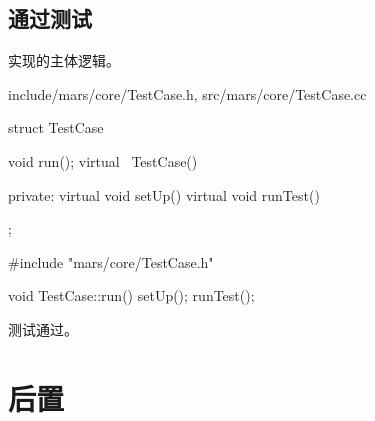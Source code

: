 \begin{content}
\subsection{通过测试}

实现的主体逻辑。

\begin{nodiff}{include/mars/core/TestCase.h, src/mars/core/TestCase.cc}
 \begin{c++}
struct TestCase {
  void run();
  virtual ~TestCase() {}

private:
  virtual void setUp() {}
  virtual void runTest() {}
};
 \end{c++}
\tcblower
 \begin{c++}
#include "mars/core/TestCase.h"

void TestCase::run() {
  setUp();
  runTest();
}
 \end{c++} 
\end{nodiff}

测试通过。

\end{content}

\section{后置}

